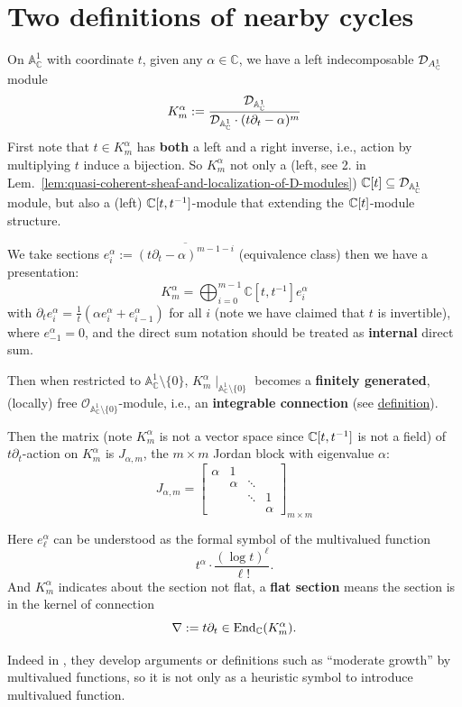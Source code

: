 \section{Two definitions of nearby cycles}\label{sect:two_definitions_of_nearby_cycles}

On $\mathbb{A}_{\mathbb{C}}^1$ with coordinate $t$, given any $\alpha \in \mathbb{C}$, we have a left indecomposable $\mathcal{D}_{{A}^1_{\mathbb{C}}}$ module
\[
    K^\alpha_m :=  \frac{\mathcal{D}_{\mathbb{A}^1_{\mathbb{C}}}}{\mathcal{D}_{\mathbb{A}^1_{\mathbb{C}}}\cdot(t\partial_t - \alpha)^m}
\]
First note that $t\in K^\alpha_m$ has \textbf{both} a left and a right inverse, i.e., action by multiplying $t$ induce a bijection.
So $K^\alpha_m$ not only a (left, see 2. in Lem.~\ref{lem:quasi-coherent-sheaf-and-localization-of-D-modules}) $\mathbb{C}[t]\subseteq \mathcal{D}_{\mathbb{A}^1_{\mathbb{C}}}$ module, but also a (left) $\mathbb{C}[t,t^{-1}]$-module that extending the $\mathbb{C}[t]$-module structure.

We take sections $e^\alpha_i := \overline{(t\partial_t - \alpha)^{m-1-i}}$ (equivalence class) then we have a presentation:
\[
    K^\alpha_m = \bigoplus_{i=0}^{m-1} \mathbb{C}[t, t^{-1}] e^\alpha_i
\]
with $\partial_t e^\alpha_i = \frac{1}{t}(\alpha e^\alpha_i + e^\alpha_{i-1})$ for all $i$ (note we have claimed that $t$ is invertible), where $e^\alpha_{-1} = 0$,
and the direct sum notation should be treated as \textbf{internal} direct sum.

Then when restricted to $\mathbb{A}_{\mathbb{C}}^1 \setminus \{0\}$, $K^\alpha_m\mid_{\mathbb{A}_{\mathbb{C}}^1 \setminus \{0\}}$
becomes a \textbf{finitely generated}, (locally) free $\mathcal{O}_{\mathbb{A}_{\mathbb{C}}^1 \setminus \{0\}}$-module, i.e., an \textbf{integrable connection} (see \hyperref[def:integrable-connection]{definition}).

Then the matrix (note $K^\alpha_m$ is not a vector space since $\mathbb{C}[t,t^{-1}]$ is not a field) of $t\partial_t$-action on $K_m^{\alpha}$ is $J_{\alpha,m}$, the $m\times m$ Jordan block with eigenvalue $\alpha$:
\[
    J_{\alpha,m} = \begin{bmatrix}
        \alpha & 1      &        &        \\
               & \alpha & \ddots &        \\
               &        & \ddots & 1      \\
               &        &        & \alpha
    \end{bmatrix}_{m \times m}
\]

\begin{remark}
    Here $e_\ell^{\alpha}$ can be understood as the formal symbol
    of the multivalued function
    \[
        t^{\alpha} \cdot \frac{(\log t)^\ell}{\ell!}.
    \]
    And $K^\alpha_{m}$ indicates about the section not flat,
    a \textbf{flat section} means the section is in the kernel of connection
    \[
        \nabla:=t\partial_t \in\operatorname{End}_{\mathbb{C}}(K^\alpha_m).
    \]

    Indeed in \cite[Ch.~5]{hotta2008d},
    they develop arguments or definitions such as ``moderate growth'' by multivalued functions,
    so it is not only as a heuristic symbol to introduce multivalued function.
\end{remark}

